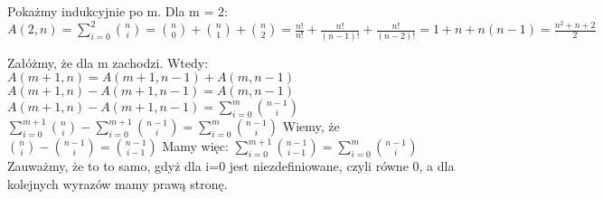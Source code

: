 \documentclass[12pt]{article}
\begin{document}
Pokażmy indukcyjnie po m. 
Dla m = 2:
$A(2, n) = \sum_{i=0}^2 \binom{n}{i} = \binom{n}{0} + \binom{n}{1} + \binom{n}{2} = \frac{n!}{n!} + \frac{n!}{(n-1)!} + \frac{n!}{(n-2)!} = 1 + n + n(n-1) = \frac{n^2+n+2}{2}$

Załóżmy, że dla m zachodzi.
Wtedy:
$A(m+1, n) = A(m+1, n-1) + A(m, n-1)$
$A(m+1, n) - A(m+1, n-1) = A(m, n-1)$
$A(m+1, n) - A(m+1, n-1) = \sum_{i=0}^m \binom{n-1}{i}$
$\sum_{i=0}^{m+1} \binom{n}{i} - \sum_{i=0}^{m+1} \binom{n-1}{i} = \sum_{i=0}^m \binom{n-1}{i}$
Wiemy, że $\binom{n}{i} - \binom{n-1}{i} = \binom{n-1}{i-1}$ Mamy więc:
$\sum_{i=0}^{m+1} \binom{n-1}{i-1} = \sum_{i=0}^m \binom{n-1}{i}$
Zauważmy, że to to samo, gdyż dla i=0 jest niezdefiniowane, czyli równe 0, a dla kolejnych wyrazów mamy prawą stronę.








\egroup
\end{document}

